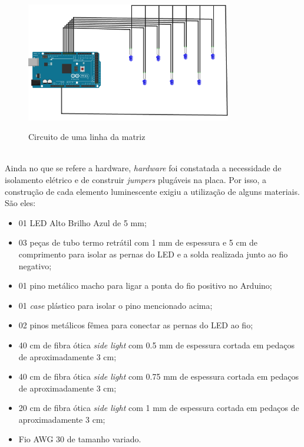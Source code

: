 \begin{figure}[H]
    \centering
    \caption{Circuito de uma linha da matriz}
	\vspace*{0,2cm}
    \includegraphics[width=0.8\textwidth]{./04-figuras/breadboard}
    \label{fig:breadboard}
\end{figure}
\vspace*{-0,9cm}
{\raggedright {}}\\


Ainda no que se refere a hardware, \textit{hardware} foi constatada a necessidade de isolamento elétrico e de construir \textit{jumpers} plugáveis na placa. Por isso, a construção de cada elemento luminescente exigiu a utilização de alguns materiais. São eles:

\begin{itemize}
  \item 01 LED Alto Brilho Azul de 5 mm;
  \item 03 peças de tubo termo retrátil com 1 mm de espessura e 5 cm de comprimento para isolar as pernas do LED e a solda realizada junto ao fio negativo;
  \item 01 pino metálico macho para ligar a ponta do fio positivo no Arduino;
  \item 01 \textit{case} plástico para isolar o pino mencionado acima;  
  \item 02 pinos metálicos fêmea para conectar as pernas do LED ao fio;
  \item 40 cm de fibra ótica \textit{side light} com 0.5 mm de espessura cortada em pedaços de aproximadamente 3 cm;
  \item 40 cm de fibra ótica \textit{side light} com 0.75 mm de espessura cortada em pedaços de aproximadamente 3 cm;
  \item 20 cm de fibra ótica \textit{side light} com 1 mm de espessura cortada em pedaços de aproximadamente 3 cm;
  \item Fio AWG 30 de tamanho variado.
\end{itemize}


